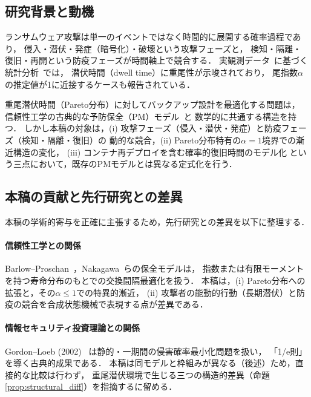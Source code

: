 \documentclass[12pt,a4paper]{article}
\theoremstyle{plain}
\theoremstyle{definition}
\theoremstyle{remark}
\begin{document}
\subsection{研究背景と動機}

ランサムウェア攻撃は単一のイベントではなく時間的に展開する確率過程であり，
侵入・潜伏・発症（暗号化）・破壊という攻撃フェーズと，
検知・隔離・復旧・再開という防疫フェーズが時間軸上で競合する．
実観測データ~\cite{mandiant2023,ibm2023}に基づく統計分析~\cite{gruber2022}では，
潜伏時間（dwell time）に重尾性が示唆されており，
尾指数$\alpha$の推定値が1に近接するケースも報告されている．

重尾潜伏時間（Pareto分布）に対してバックアップ設計を最適化する問題は，
信頼性工学の古典的な予防保全（PM）モデル~\cite{barlow1965,nakagawa2005}と
数学的に共通する構造を持つ．
しかし本稿の対象は，(i) 攻撃フェーズ（侵入・潜伏・発症）と防疫フェーズ（検知・隔離・復旧）の
動的な競合，(ii) Pareto分布特有の$\alpha=1$境界での漸近構造の変化，
(iii) コンテナ再デプロイを含む確率的復旧時間のモデル化
という三点において，既存のPMモデルとは異なる定式化を行う．

\subsection{本稿の貢献と先行研究との差異}

本稿の学術的寄与を正確に主張するため，先行研究との差異を以下に整理する．

\paragraph{信頼性工学との関係}
Barlow--Proschan~\cite{barlow1965}，Nakagawa~\cite{nakagawa2005}らの保全モデルは，
指数または有限モーメントを持つ寿命分布のもとでの交換間隔最適化を扱う．
本稿は，(i) Pareto分布への拡張と，その$\alpha\le1$での特異的漸近，
(ii) 攻撃者の能動的行動（長期潜伏）と防疫の競合を合成状態機械で表現する点が差異である．

\paragraph{情報セキュリティ投資理論との関係}
Gordon--Loeb (2002)~\cite{gordon2002} は静的・一期間の侵害確率最小化問題を扱い，
「1/e則」を導く古典的成果である．
本稿は同モデルと枠組みが異なる（後述）ため，直接的な比較は行わず，
重尾潜伏環境で生じる三つの構造的差異（命題\ref{prop:structural_diff}）を指摘するに留める．
\end{document}
